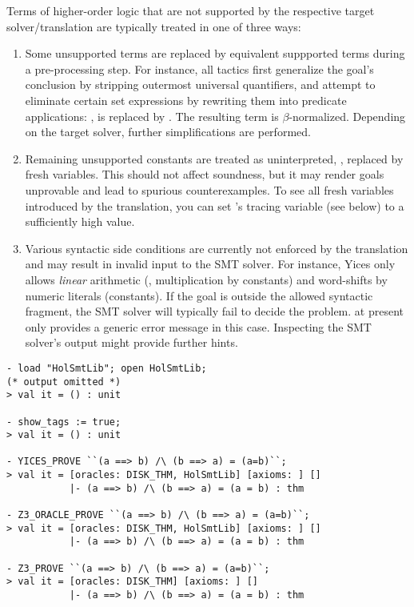 Terms of higher-order logic that are not supported by the respective
target solver/\allowbreak translation are typically treated in one of
three ways:
\begin{enumerate}
\item Some unsupported terms are replaced by equivalent suppported
  terms during a pre-processing step.  For instance, all tactics first
  generalize the goal's conclusion by stripping outermost universal
  quantifiers, and attempt to eliminate certain set expressions by
  rewriting them into predicate applications: \eg,  is replaced by .  The resulting term is
  $\beta$-normalized.  Depending on the target solver, further
  simplifications are performed.
\item Remaining unsupported constants are treated as uninterpreted,
  \ie, replaced by fresh variables.  This should not affect soundness,
  but it may render goals unprovable and lead to spurious
  counterexamples.  To see all fresh variables introduced by the
  translation, you can set 's tracing variable (see
  below) to a sufficiently high value.
\item Various syntactic side conditions are currently not enforced by
  the translation and may result in invalid input to the SMT solver.
  For instance, Yices only allows \emph{linear} arithmetic (\ie,
  multiplication by constants) and word-shifts by numeric literals
  (constants).  If the goal is outside the allowed syntactic fragment,
  the SMT solver will typically fail to decide the problem.
   at present only provides a generic error message in
  this case.  Inspecting the SMT solver's output might provide further
  hints.
\end{enumerate}

\begin{session}
\begin{verbatim}
- load "HolSmtLib"; open HolSmtLib;
(* output omitted *)
> val it = () : unit

- show_tags := true;
> val it = () : unit

- YICES_PROVE ``(a ==> b) /\ (b ==> a) = (a=b)``;
> val it = [oracles: DISK_THM, HolSmtLib] [axioms: ] []
           |- (a ==> b) /\ (b ==> a) = (a = b) : thm

- Z3_ORACLE_PROVE ``(a ==> b) /\ (b ==> a) = (a=b)``;
> val it = [oracles: DISK_THM, HolSmtLib] [axioms: ] []
           |- (a ==> b) /\ (b ==> a) = (a = b) : thm

- Z3_PROVE ``(a ==> b) /\ (b ==> a) = (a=b)``;
> val it = [oracles: DISK_THM] [axioms: ] []
           |- (a ==> b) /\ (b ==> a) = (a = b) : thm
\end{verbatim}
\end{session}

